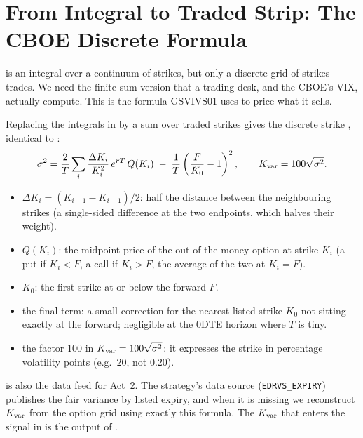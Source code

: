 \section{From Integral to Traded Strip: The CBOE Discrete Formula}
\label{sec:gsvivs:cboe-discrete}

 is an integral over a continuum of strikes, but only a discrete grid of strikes trades. We need the finite-sum version that a trading desk, and the CBOE's VIX, actually compute. This is the formula GSVIVS01 uses to price what it sells.

Replacing the integrals in  by a sum over traded strikes gives the discrete strike \citep[as in the VIX construction,][]{CarrLee2009}, identical to :
\begin{equation}
\label{eq:gsvivs:cboe}
\sigma^2 = \frac{2}{T}\sum_i \frac{\Delta K_i}{K_i^2}\,e^{rT}\,Q(K_i) \;-\; \frac{1}{T}\left(\frac{F}{K_0} - 1\right)^2 ,
\qquad K_{\mathrm{var}} = 100\sqrt{\sigma^2}.
\end{equation}
\begin{itemize}
  \item $\Delta K_i = (K_{i+1} - K_{i-1})/2$: half the distance between the neighbouring strikes (a single-sided difference at the two endpoints, which halves their weight).
  \item $Q(K_i)$: the midpoint price of the out-of-the-money option at strike $K_i$ (a put if $K_i < F$, a call if $K_i > F$, the average of the two at $K_i = F$).
  \item $K_0$: the first strike at or below the forward $F$.
  \item the final term: a small correction for the nearest listed strike $K_0$ not sitting exactly at the forward; negligible at the 0DTE horizon where $T$ is tiny.
  \item the factor $100$ in $K_{\mathrm{var}} = 100\sqrt{\sigma^2}$: it expresses the strike in percentage volatility points (e.g.\ $20$, not $0.20$).
\end{itemize}

\begin{projectconnection}
 is also the data feed for Act~2. The strategy's data source (\texttt{EDRVS\_EXPIRY}) publishes the fair variance by listed expiry, and when it is missing we reconstruct $K_{\mathrm{var}}$ from the option grid using exactly this formula. The $K_{\mathrm{var}}$ that enters the signal in  is the output of .
\end{projectconnection}

